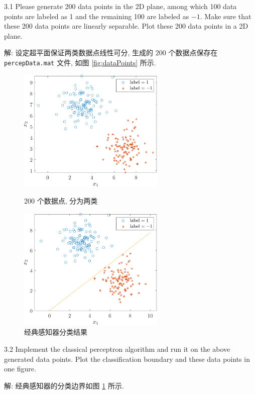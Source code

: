 \documentclass[openany]{ctexbook}
\theoremstyle{kaiti}
\theoremstyle{normal}
\begin{document}
3.1 Please generate 200 data points in the 2D plane, among which 100 data points are labeled as 1 and the remaining 100 are labeled as $-1$. Make sure that these 200 data points are linearly separable. Plot these 200 data points in a 2D plane.

解: 设定超平面保证两类数据点线性可分, 生成的 200 个数据点保存在 \verb|percepData.mat| 文件, 如图 \ref{fig:dataPoints} 所示.

\begin{figure}[tbp]
  \centering
  \begin{minipage}[t]{0.48\textwidth}
  \centering
  \includegraphics[width=7cm]{dataPoints.pdf}
  \caption{200 个数据点, 分为两类}
  \label{fig:dataPoints}
  \end{minipage}
  \begin{minipage}[t]{0.48\textwidth}
  \centering
  \includegraphics[width=7cm]{classicalPrecep.pdf}
  \caption{经典感知器分类结果}
  \label{fig:classicalPrecep}
  \end{minipage}
\end{figure}

3.2 Implement the classical perceptron algorithm and run it on the above generated data points. Plot the classification boundary and these data points in one figure.

解: 经典感知器的分类边界如图 \ref{fig:classicalPrecep} 所示.
\end{document}
